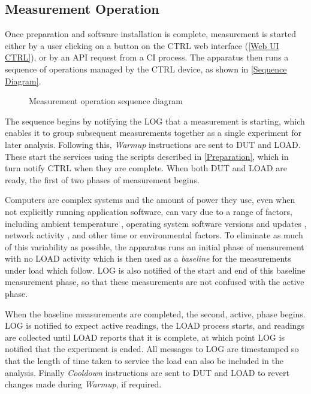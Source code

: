 \subsection{Measurement Operation}
\label{Measurement}

Once preparation and software installation is complete, measurement is started either by a user clicking on a button on the CTRL web interface (\autoref{Web UI CTRL}), or by an API request from a CI process. The apparatus then runs a sequence of operations managed by the CTRL device, as shown in \autoref{Sequence Diagram}.

\begin{figure}[htbp]
  \centering
  
  \caption{Measurement operation sequence diagram}
  \label{Sequence Diagram}
\end{figure}

The sequence begins by notifying the LOG that a measurement is starting, which enables it to group subsequent measurements together as a single experiment for later analysis. Following this, \emph{Warmup} instructions are sent to DUT and LOAD. These start the services using the scripts described in \autoref{Preparation}, which in turn notify CTRL when they are complete. When both DUT and LOAD are ready, the first of two phases of measurement begins.

Computers are complex systems and the amount of power they use, even when not explicitly running application software, can vary due to a range of factors, including ambient temperature \citep{Jin2022}, operating system software versions and updates \citep{Williams2015}, network activity \citep{Canek2022}, and other time or environmental factors. To eliminate as much of this variability as possible, the apparatus runs an initial phase of measurement with no LOAD activity which is then used as a \emph{baseline} for the measurements under load which follow. LOG is also notified of the start and end of this baseline measurement phase, so that these measurements are not confused with the active phase.

When the baseline measurements are completed, the second, active, phase begins. LOG is notified to expect active readings, the LOAD process starts, and readings are collected until LOAD reports that it is complete, at which point LOG is notified that the experiment is ended. All messages to LOG are timestamped so that the length of time taken to service the load can also be included in the analysis. Finally \emph{Cooldown} instructions are sent to DUT and LOAD to revert changes made during \emph{Warmup}, if required.

